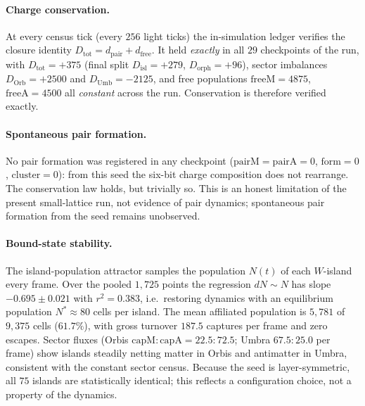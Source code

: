 \documentclass{ijuc}
\begin{document}
\paragraph{Charge conservation.} At every census tick (every $256$ light ticks) the in-simulation ledger verifies the closure identity $D_{\mathrm{tot}}=d_{\mathrm{pair}}+d_{\mathrm{free}}$.  It held \emph{exactly} in all $29$ checkpoints of the run, with $D_{\mathrm{tot}}=+375$ (final split $D_{\mathrm{isl}}=+279$, $D_{\mathrm{orph}}=+96$), sector imbalances $D_{\mathrm{Orb}}=+2500$ and $D_{\mathrm{Umb}}=-2125$, and free populations $\mathrm{freeM}=4875$, $\mathrm{freeA}=4500$ all \emph{constant} across the run.  Conservation is therefore verified exactly.
\paragraph{Spontaneous pair formation.} No pair formation was registered in any checkpoint ($\mathrm{pairM}=\mathrm{pairA}=0$, $\mathrm{form}=0$, $\mathrm{cluster}=0$): from this seed the six-bit charge composition does not rearrange.  The conservation law holds, but trivially so.  This is an honest limitation of the present small-lattice run, not evidence of pair dynamics; spontaneous pair formation from the seed remains unobserved.
\paragraph{Bound-state stability.} The island-population attractor samples the population $N(t)$ of each $W$-island every frame.  Over the pooled $1{,}725$ points the regression $dN\sim N$ has slope $-0.695\pm0.021$ with $r^{2}=0.383$, i.e.\ restoring dynamics with an equilibrium population $N^{*}\approx80$ cells per island.  The mean affiliated population is $5{,}781$ of $9{,}375$ cells ($61.7\%$), with gross turnover $187.5$ captures per frame and zero escapes.  Sector fluxes (Orbis $\mathrm{capM}{:}\mathrm{capA}=22.5{:}72.5$; Umbra $67.5{:}25.0$ per frame) show islands steadily netting matter in Orbis and antimatter in Umbra, consistent with the constant sector census.  Because the seed is layer-symmetric, all $75$ islands are statistically identical; this reflects a configuration choice, not a property of the dynamics.
\end{document}
